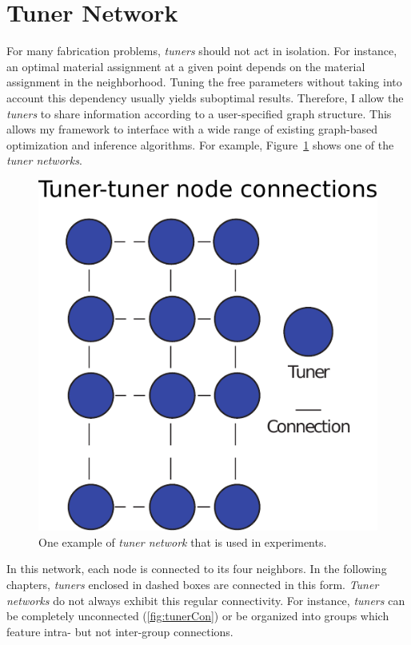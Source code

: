 \section{Tuner Network}
\label{sec:TunerNetwork}
For many fabrication problems, \emph{tuners} should not act in isolation. For instance, an optimal material assignment at a given point depends on the material assignment in the neighborhood. Tuning the free parameters without taking into account this dependency usually yields suboptimal results. Therefore, I allow the \emph{tuners} to share information according to a user-specified graph structure. This allows my framework to interface with a wide range of existing graph-based optimization and inference algorithms. For example, Figure~\ref{fig:tunerNet} shows one of the \emph{tuner networks}.

\begin{figure}[h]
\centering
\includegraphics[scale=0.6]{figure/tunerNet.pdf}
\caption{ 
	One example of \emph{tuner network} that is used in experiments.}
\label{fig:tunerNet}
\end{figure}

In this network, each node is connected to its four neighbors.
In the following chapters, \emph{tuners} enclosed in dashed boxes are connected in this form.
\emph{Tuner networks} do not always exhibit this regular connectivity.
For instance, \emph{tuners} can be completely unconnected (\autoref{fig:tunerCon}) or be organized into groups which feature intra- but not inter-group connections.

